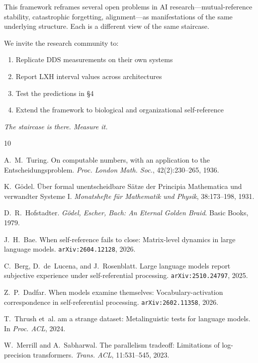 \documentclass[11pt,a4paper]{article}
\begin{document}
This framework reframes several open problems in AI research---mutual-reference stability, catastrophic forgetting, alignment---as manifestations of the same underlying structure. Each is a different view of the same staircase.

We invite the research community to:
\begin{enumerate}
\item Replicate DDS measurements on their own systems
\item Report LXH interval values across architectures
\item Test the predictions in \S4
\item Extend the framework to biological and organizational self-reference
\end{enumerate}

\textit{The staircase is there. Measure it.}


\begin{thebibliography}{10}

A.~M.~Turing.
\newblock On computable numbers, with an application to the {E}ntscheidungsproblem.
\newblock \emph{Proc. London Math. Soc.}, 42(2):230--265, 1936.

K.~G\"odel.
\newblock \"Uber formal unentscheidbare S\"atze der {P}rincipia {M}athematica und verwandter {S}ysteme {I}.
\newblock \emph{Monatshefte f\"ur Mathematik und Physik}, 38:173--198, 1931.

D.~R.~Hofstadter.
\newblock \emph{G\"odel, Escher, Bach: An Eternal Golden Braid}.
\newblock Basic Books, 1979.

J.~H.~Bae.
\newblock When self-reference fails to close: Matrix-level dynamics in large language models.
\newblock \texttt{arXiv:2604.12128}, 2026.

C.~Berg, D.~de~Lucena, and J.~Rosenblatt.
\newblock Large language models report subjective experience under self-referential processing.
\newblock \texttt{arXiv:2510.24797}, 2025.

Z.~P.~Dadfar.
\newblock When models examine themselves: Vocabulary-activation correspondence in self-referential processing.
\newblock \texttt{arXiv:2602.11358}, 2026.

T.~Thrush et~al.
 am a strange dataset: Metalinguistic tests for language models.
\newblock In \emph{Proc. ACL}, 2024.

W.~Merrill and A.~Sabharwal.
\newblock The parallelism tradeoff: Limitations of log-precision transformers.
\newblock \emph{Trans. ACL}, 11:531--545, 2023.

\end{thebibliography}
\end{document}
